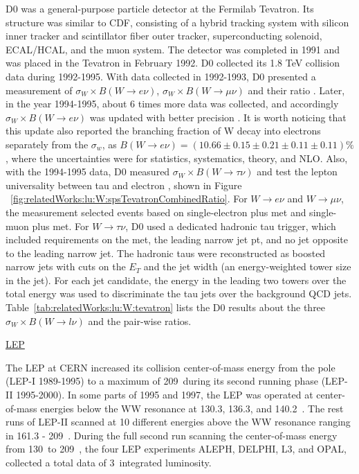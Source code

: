D0 was a general-purpose particle detector at the Fermilab Tevatron. Its structure was similar to CDF, consisting of a hybrid tracking system with silicon inner tracker and scintillator fiber outer tracker, superconducting solenoid, ECAL/HCAL, and the muon system. The detector was completed in 1991 and was placed in the Tevatron in February 1992. D0 collected its 1.8 TeV collision data during 1992-1995. With data collected in 1992-1993, D0 presented a measurement of $\sigma_W \times B(W\to e\nu)$, $\sigma_W \times B(W\to \mu \nu)$ and their ratio \cite{Abachi:1995xc}. Later, in the year 1994-1995, about 6 times more data was collected, and accordingly $\sigma_W \times B(W\to e\nu)$ was updated with better precision \cite{Abbott:1999tt}. It is worth noticing that this update \cite{Abbott:1999tt} also reported the branching fraction of W decay into electrons separately from the $\sigma_w$, as $B(W\to e\nu)=(10.66\pm0.15\pm0.21\pm0.11\pm0.11)\%$, where the uncertainties were for statistics, systematics, theory, and NLO. Also, with the 1994-1995 data, D0 measured $\sigma_W \times B(W\to \tau \nu)$ and test the lepton universality between tau and electron \cite{Abbott:1999pk}, shown in Figure ~\ref{fig:relatedWorks:lu:W:spsTevatronCombinedRatio}. For $W \to e \nu$ and $W \to \mu \nu$, the measurement selected events based on single-electron plus met and single-muon plus met. For $W \to \tau \nu$, D0 used a dedicated hadronic tau trigger, which included requirements on the met, the leading narrow jet pt, and no jet opposite to the leading narrow jet. The hadronic taus were reconstructed as boosted narrow jets with cuts on the $E_T$ and the jet width (an energy-weighted tower size in the jet). For each jet candidate, the energy in the leading two towers over the total energy was used to discriminate the tau jets over the background QCD jets. Table~\ref{tab:relatedWorks:lu:W:tevatron} lists the D0 results about the three $\sigma_W \times B(W\to l \nu)$ and the pair-wise ratios. 






\underline{LEP}

The LEP at CERN increased its collision center-of-mass energy from the \PZ pole (LEP-I 1989-1995) to a maximum of 209~\GeV during its second running phase (LEP-II 1995-2000). In some parts of 1995 and 1997, the LEP was operated at center-of-mass energies below the WW resonance at 130.3, 136.3, and 140.2~\GeV. The rest runs of LEP-II scanned at 10 different energies above the WW resonance ranging in 161.3 - 209~\GeV. During the full second run scanning the center-of-mass energy from 130~\GeV to 209~\GeV, the four LEP experiments ALEPH, DELPHI, L3, and OPAL, collected a total data of 3~\fbinv integrated luminosity. 

